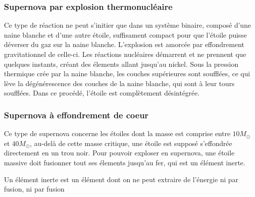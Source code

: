 \documentclass[11pt]{book} %
\begin{document}
\subsubsection{Supernova par explosion thermonucléaire \cite{supth}\cite{sup1a}}
Ce type de réaction ne peut s'initier que dans un système binaire, composé d'une naine blanche et d'une autre étoile, suffisament compact pour que l'étoile puisse déverser du gaz sur la naine blanche. L'explosion est amorcée par effondrement gravitationnel de celle-ci. Les réactions nucléaires démarrent et ne prennent que quelques instants, créant des élements allant jusqu'au nickel. Sous la pression thermique crée par la naine blanche, les couches supérieures sont soufflées, ce qui lève la dégénérescence des couches de la naine blanche, qui sont à leur tours soufflées. Dans ce procédé, l'étoile est complètement désintégrée.

\subsubsection{Supernova à effondrement de coeur \cite{supec}\cite{sup2}}
Ce type de supernova concerne les étoiles dont la masse est comprise entre \(10M_\odot\) et \(40M_\odot\), au-delà de cette masse critique, une étoile est supposé s'effondrée directement en un trou noir. Pour pouvoir exploser en supernova, une étoile massive doit fusionner tout ses élements jusqu'au fer, qui est un élément inerte.
\begin{remark}
    Un élément inerte est un élément dont on ne peut extraire de l'énergie ni par fusion, ni par fusion 
\end{remark}
\end{document}
